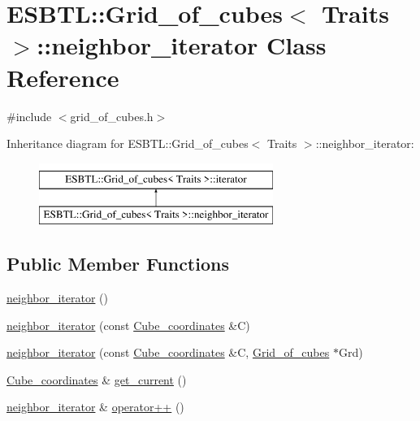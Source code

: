 \hypertarget{classESBTL_1_1Grid__of__cubes_1_1neighbor__iterator}{}\section{E\+S\+B\+TL\+:\+:Grid\+\_\+of\+\_\+cubes$<$ Traits $>$\+:\+:neighbor\+\_\+iterator Class Reference}
\label{classESBTL_1_1Grid__of__cubes_1_1neighbor__iterator}


{\ttfamily \#include $<$grid\+\_\+of\+\_\+cubes.\+h$>$}

Inheritance diagram for E\+S\+B\+TL\+:\+:Grid\+\_\+of\+\_\+cubes$<$ Traits $>$\+:\+:neighbor\+\_\+iterator\+:\begin{figure}[H]
\begin{center}
\leavevmode
\includegraphics[height=2.000000cm]{classESBTL_1_1Grid__of__cubes_1_1neighbor__iterator}
\end{center}
\end{figure}
\subsection*{Public Member Functions}
\begin{DoxyCompactItemize}
\item 
\hyperlink{classESBTL_1_1Grid__of__cubes_1_1neighbor__iterator_a6d9db0dd9b4ea698dbfeb9edfb4e04ff}{neighbor\+\_\+iterator} ()
\item 
\hyperlink{classESBTL_1_1Grid__of__cubes_1_1neighbor__iterator_a6bd08cf90dc9bc48ba0ec6a209c5c1e2}{neighbor\+\_\+iterator} (const \hyperlink{structESBTL_1_1Grid__of__cubes_ad55c84346bab961e08d95e494551d07d}{Cube\+\_\+coordinates} \&C)
\item 
\hyperlink{classESBTL_1_1Grid__of__cubes_1_1neighbor__iterator_a6eaaee1feeb226221cb5711ea6242102}{neighbor\+\_\+iterator} (const \hyperlink{structESBTL_1_1Grid__of__cubes_ad55c84346bab961e08d95e494551d07d}{Cube\+\_\+coordinates} \&C, \hyperlink{structESBTL_1_1Grid__of__cubes}{Grid\+\_\+of\+\_\+cubes} $\ast$Grd)
\item 
\hyperlink{structESBTL_1_1Grid__of__cubes_ad55c84346bab961e08d95e494551d07d}{Cube\+\_\+coordinates} \& \hyperlink{classESBTL_1_1Grid__of__cubes_1_1neighbor__iterator_ac5e74d1983825788f0e80892b96c3517}{get\+\_\+current} ()
\item 
\hyperlink{classESBTL_1_1Grid__of__cubes_1_1neighbor__iterator}{neighbor\+\_\+iterator} \& \hyperlink{classESBTL_1_1Grid__of__cubes_1_1neighbor__iterator_a18641650d9d12e66224817deee861bc1}{operator++} ()
\end{DoxyCompactItemize}

